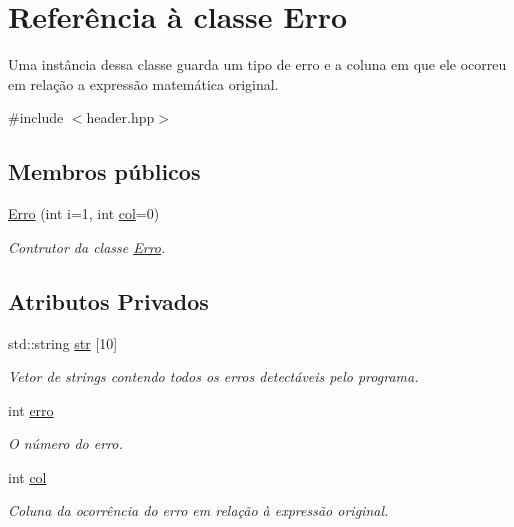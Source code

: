 \hypertarget{class_erro}{\section{Referência à classe Erro}
\label{class_erro}
}


Uma instância dessa classe guarda um tipo de erro e a coluna em que ele ocorreu em relação a expressão matemática original.  




{\ttfamily \#include $<$header.\-hpp$>$}

\subsection*{Membros públicos}
\begin{DoxyCompactItemize}
\item 
\hyperlink{class_erro_a13cee93b512d274148d1357a3f490b02}{Erro} (int i=1, int \hyperlink{class_erro_a6134fb8eff73c4ce1fe1da37ac484ae9}{col}=0)
\begin{DoxyCompactList}\small\item\em Contrutor da classe \hyperlink{class_erro}{Erro}. \end{DoxyCompactList}\end{DoxyCompactItemize}
\subsection*{Atributos Privados}
\begin{DoxyCompactItemize}
\item 
std\-::string \hyperlink{class_erro_a88b4b69d608c3eba8aeaead2e6a78fcf}{str} \mbox{[}10\mbox{]}
\begin{DoxyCompactList}\small\item\em Vetor de strings contendo todos os erros detectáveis pelo programa. \end{DoxyCompactList}\item 
\hypertarget{class_erro_a7e1772f74840101973c1a724059c874f}{int \hyperlink{class_erro_a7e1772f74840101973c1a724059c874f}{erro}}\label{class_erro_a7e1772f74840101973c1a724059c874f}

\begin{DoxyCompactList}\small\item\em O número do erro. \end{DoxyCompactList}\item 
\hypertarget{class_erro_a6134fb8eff73c4ce1fe1da37ac484ae9}{int \hyperlink{class_erro_a6134fb8eff73c4ce1fe1da37ac484ae9}{col}}\label{class_erro_a6134fb8eff73c4ce1fe1da37ac484ae9}

\begin{DoxyCompactList}\small\item\em Coluna da ocorrência do erro em relação à expressão original. \end{DoxyCompactList}\end{DoxyCompactItemize}
